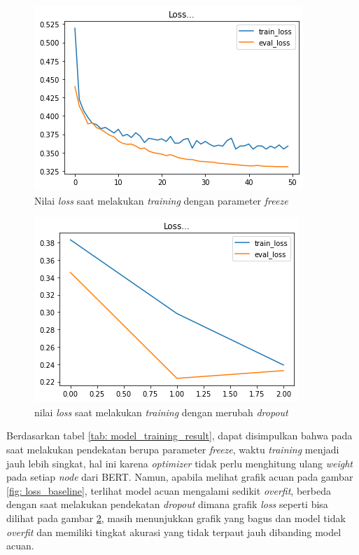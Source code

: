 \begin{figure}[h]
    \begin{center}
        \includegraphics[width= 0.9\linewidth]{gambar/loss_freeze_50.png}
        \caption{Nilai \textit{loss} saat melakukan \textit{training} dengan parameter \textit{freeze}}
        \label{fig: loss_freeze}
    \end{center}
\end{figure}

\begin{figure}[h]
    \begin{center}
        \includegraphics[width= 0.9\linewidth]{gambar/loss_dropout_new.png}
        \caption{nilai \textit{loss} saat melakukan \textit{training} dengan merubah \textit{dropout}}
        \label{fig: loss_dropout}
    \end{center}
\end{figure}

Berdasarkan tabel \ref{tab: model_training_result}, dapat disimpulkan bahwa pada saat melakukan pendekatan berupa parameter \textit{freeze}, waktu \textit{training} menjadi jauh lebih singkat, hal ini karena \textit{optimizer} tidak perlu menghitung ulang \textit{weight} pada setiap \textit{node} dari BERT. Namun, apabila melihat grafik acuan pada gambar \ref{fig: loss_baseline}, terlihat model acuan mengalami sedikit \textit{overfit},  berbeda dengan saat melakukan pendekatan \textit{dropout} dimana grafik \textit{loss} seperti bisa dilihat pada gambar \ref{fig: loss_dropout}, masih menunjukkan grafik yang bagus dan model tidak \textit{overfit} dan memiliki tingkat akurasi yang tidak terpaut jauh dibanding model acuan.